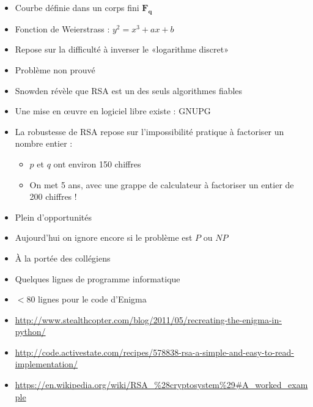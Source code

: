 \documentclass[french]{article}
\begin{document}
    \begin{itemize}
      \item Courbe définie dans un corps fini $\mathbf{F_q}$
      \item Fonction de Weierstrass : $y^2 = x^3 + ax + b$
      \item Repose sur la difficulté à inverser le «logarithme discret»
      \item Problème non prouvé
    \end{itemize}

  \begin{itemize}
    \item Snowden révèle que RSA est un des seuls algorithmes fiables
    \item Une mise en œuvre en logiciel libre existe : GNUPG
    \item La robustesse de RSA repose sur l'impossibilité pratique à
      factoriser un nombre entier :
      \begin{itemize}
        \item $p$ et $q$ ont environ 150 chiffres
        \item On met 5 ans, avec une grappe de calculateur à factoriser
          un entier de 200 chiffres !
      \end{itemize}
    \item Plein d'opportunités
    \item Aujourd'hui on ignore encore si le problème est $P$ ou $NP$
  \end{itemize}

    \begin{itemize}
      \item À la portée des collégiens
      \item Quelques lignes de programme informatique
      \item $<80$ lignes pour le code d'Enigma
      \item
        \url{http://www.stealthcopter.com/blog/2011/05/recreating-the-enigma-in-python/}
      \item
        \url{http://code.activestate.com/recipes/578838-rsa-a-simple-and-easy-to-read-implementation/}
      \item
        \url{https://en.wikipedia.org/wiki/RSA_\%28cryptosystem\%29\#A_worked_example}
    \end{itemize}

\end{document}
